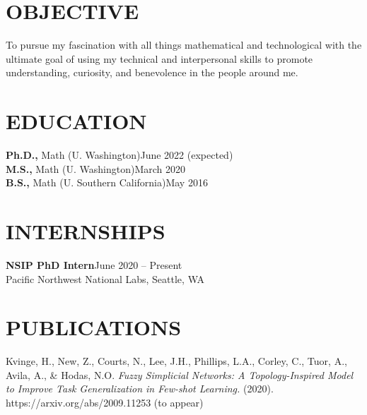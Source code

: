 \documentclass[margin]{res} %
\begin{document}
\begin{resume}

 
\section{OBJECTIVE}  

To pursue my fascination with all things mathematical and technological with the ultimate goal of using my 
technical and interpersonal skills to promote understanding, curiosity, and benevolence in the people around me.


\section{EDUCATION}

{\bf Ph.D.,} Math (U. Washington)\hfill June 2022 (expected) \\
{\bf M.S.,} Math (U. Washington)\hfill March 2020 \\
{\bf B.S.,} Math (U. Southern California)\hfill May 2016 


 
\section{INTERNSHIPS}
\textbf{NSIP PhD Intern}\hfill June 2020 -- Present\\
Pacific Northwest National Labs, Seattle, WA

\section{PUBLICATIONS}
Kvinge, H., New, Z., Courts, N., Lee, J.H., Phillips, L.A., Corley, C., Tuor, A., Avila, A., \& Hodas, N.O.
\textit{Fuzzy Simplicial Networks: A Topology-Inspired Model to Improve Task Generalization in Few-shot Learning.} (2020).
https://arxiv.org/abs/2009.11253 (to appear)


\end{resume}
\end{document}
